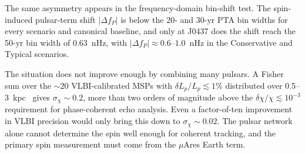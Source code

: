 \documentclass[aps,prx,twocolumn,superscriptaddress,nofootinbib,longbibliography]{revtex4-2}
\begin{document}
The same asymmetry appears in the frequency-domain bin-shift test. The spin-induced pulsar-term shift $|\Delta f_P|$ is below the 20- and 30-yr PTA bin widths for every scenario and canonical baseline, and only at J0437 does the shift reach the 50-yr bin width of $0.63$~nHz, with $|\Delta f_P|\approx0.6$--$1.0$~nHz in the Conservative and Typical scenarios.

The situation does not improve enough by combining many pulsars. A Fisher sum over the $\sim20$ VLBI-calibrated MSPs with $\delta L_p/L_p\lesssim1\%$ distributed over 0.5--3~kpc~\cite{Deller2019,Ding2023} gives $\sigma_\chi\sim0.2$, more than two orders of magnitude above the $\delta\chi/\chi\lesssim10^{-3}$ requirement for phase-coherent echo analysis. Even a factor-of-ten improvement in VLBI precision would only bring this down to $\sigma_\chi\sim0.02$. The pulsar network alone cannot determine the spin well enough for coherent tracking, and the primary spin measurement must come from the $\mu$Ares Earth term.


\end{document}
